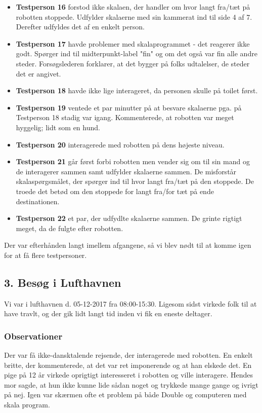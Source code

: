 \begin{itemize}
\item \textbf{Testperson 16} forstod ikke skalaen, der handler om hvor langt fra/tæt på robotten stoppede. Udfylder skalaerne med sin kammerat ind til side 4 af 7. Derefter udfyldes det af en enkelt person.
\item \textbf{Testperson 17} havde problemer med skalaprogrammet - det reagerer ikke godt. Spørger ind til midterpunkt-label "fin" og om det også var fin alle andre steder. Forsøgslederen forklarer, at det bygger på folks udtalelser, de steder det er angivet.
\item \textbf{Testperson 18} havde ikke lige interageret, da personen skulle på toilet først.
\item 	\textbf{Testperson 19} ventede et par minutter på at besvare skalaerne pga. på Testperson 18 stadig var igang. Kommenterede, at robotten var meget hyggelig; lidt som en hund.
\item 	\textbf{Testperson 20} interagerede med robotten på dens højeste niveau.
\item \textbf{Testperson 21} går først forbi robotten men vender sig om til sin mand og de interagerer sammen samt udfylder skalaerne sammen. De misforstår skalaspørgsmålet, der spørger ind til hvor langt fra/tæt på den stoppede. De troede det betød om den stoppede for langt fra/for tæt på ende destinationen.
\item \textbf{Testperson 22} et par, der udfydlte skalaerne sammen. De grinte rigtigt meget, da de fulgte efter robotten.
\end{itemize}

Der var efterhånden langt imellem afgangene, så vi blev nødt til at komme igen for at få flere testpersoner.

\subsection{3. Besøg i Lufthavnen}
Vi var i lufthavnen d. 05-12-2017 fra 08:00-15:30. Ligesom sidst virkede folk til at have travlt, og der gik lidt langt tid inden vi fik en eneste deltager. 

\subsubsection{Observationer}
Der var få ikke-dansktalende rejsende, der interagerede med robotten. En enkelt britte, der kommenterede, at det var ret imponerende og at han elskede det. En pige på 12 år virkede oprigtigt interesseret i robotten og ville interagere. Hendes mor sagde, at hun ikke kunne lide sådan noget og trykkede mange gange og ivrigt på nej.
Igen var skærmen ofte et problem på både Double og computeren med skala program.

